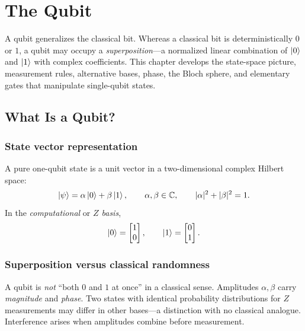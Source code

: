 \chapter{The Qubit}
\label{ch:qubit}

A qubit generalizes the classical bit. Whereas a classical bit is deterministically $0$ or $1$, a qubit may occupy a \emph{superposition}---a normalized linear combination of $\ket{0}$ and $\ket{1}$ with complex coefficients. This chapter develops the state-space picture, measurement rules, alternative bases, phase, the Bloch sphere, and elementary gates that manipulate single-qubit states.

\section{What Is a Qubit?}
\label{sec:what-qubit}

\subsection{State vector representation}

A pure one-qubit state is a unit vector in a two-dimensional complex Hilbert space:
\begin{equation}
\ket{\psi} = \alpha\ket{0} + \beta\ket{1},\qquad
\alpha,\beta\in\mathbb{C},\qquad
|\alpha|^2 + |\beta|^2 = 1.
\label{eq:qubit-state}
\end{equation}
In the \emph{computational} or \emph{$Z$ basis},
\begin{equation}
\ket{0}=\begin{bmatrix}1\\0\end{bmatrix},\qquad
\ket{1}=\begin{bmatrix}0\\1\end{bmatrix}.
\label{eq:computational-basis}
\end{equation}

\subsection{Superposition versus classical randomness}

A qubit is \emph{not} ``both $0$ and $1$ at once'' in a classical sense. Amplitudes $\alpha,\beta$ carry \emph{magnitude} and \emph{phase}. Two states with identical probability distributions for $Z$ measurements may differ in other bases---a distinction with no classical analogue. Interference arises when amplitudes combine before measurement.

